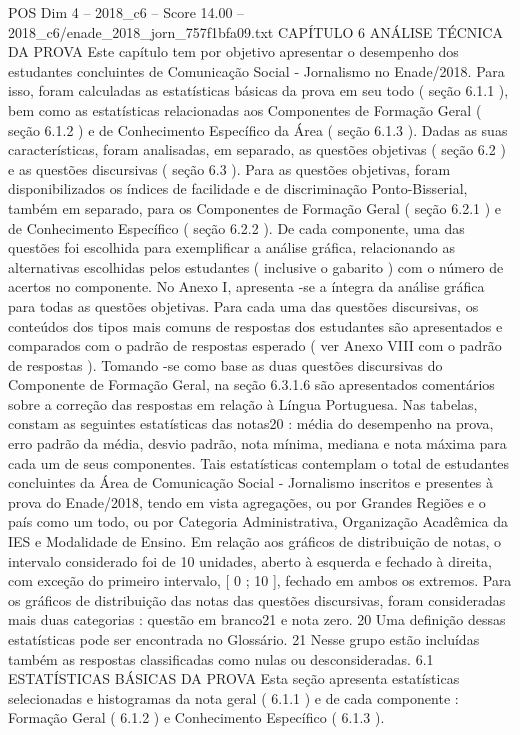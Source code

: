 \begin{textsample}{POS Dim 4 – 2018\_c6 – Score 14.00 – 2018\_c6/enade\_2018\_jorn\_757f1bfa09.txt}  \label{ex:f4_pos_005}
CAPÍTULO 6 ANÁLISE TÉCNICA DA PROVA Este capítulo tem por objetivo apresentar o desempenho dos estudantes concluintes de Comunicação Social - Jornalismo no Enade/2018.
Para isso, foram calculadas as estatísticas básicas da prova em seu todo ( seção 6.1.1 ), bem como as estatísticas relacionadas aos Componentes de Formação Geral ( seção 6.1.2 ) e de Conhecimento Específico da Área ( seção 6.1.3 ).
Dadas as suas características, foram analisadas, em separado, as questões objetivas ( seção 6.2 ) e as questões discursivas ( seção 6.3 ).
Para as questões objetivas, foram disponibilizados os índices de facilidade e de discriminação Ponto-Bisserial, também em separado, para os Componentes de Formação Geral ( seção 6.2.1 ) e de Conhecimento Específico ( seção 6.2.2 ).
De cada componente, uma das questões foi escolhida para exemplificar a análise gráfica, relacionando as alternativas escolhidas pelos estudantes ( inclusive o gabarito ) com o número de acertos no componente.
No Anexo I, apresenta -se a íntegra da análise gráfica para todas as questões objetivas.
Para cada uma das questões discursivas, os conteúdos dos tipos mais comuns de respostas dos estudantes são apresentados e comparados com o padrão de respostas esperado ( ver Anexo VIII com o padrão de respostas ).
Tomando -se como base as duas questões discursivas do Componente de Formação Geral, na seção 6.3.1.6 são apresentados comentários sobre a correção das respostas em relação à Língua Portuguesa.
Nas tabelas, constam as seguintes estatísticas das notas20 : média do desempenho na prova, erro padrão da média, desvio padrão, nota mínima, mediana e nota máxima para cada um de seus componentes.
Tais estatísticas contemplam o total de estudantes concluintes da Área de Comunicação Social - Jornalismo inscritos e presentes à prova do Enade/2018, tendo em vista agregações, ou por Grandes Regiões e o país como um todo, ou por Categoria Administrativa, Organização Acadêmica da IES e Modalidade de Ensino.
Em relação aos gráficos de distribuição de notas, o intervalo considerado foi de 10 unidades, aberto à esquerda e fechado à direita, com exceção do primeiro intervalo, [ 0 ; 10 ], fechado em ambos os extremos.
Para os gráficos de distribuição das notas das questões discursivas, foram consideradas mais duas categorias : questão em branco21 e nota zero. 20 Uma definição dessas estatísticas pode ser encontrada no Glossário. 21 Nesse grupo estão incluídas também as respostas classificadas como nulas ou desconsideradas. 6.1 ESTATÍSTICAS BÁSICAS DA PROVA Esta seção apresenta estatísticas selecionadas e histogramas da nota geral ( 6.1.1 ) e de cada componente : Formação Geral ( 6.1.2 ) e Conhecimento Específico ( 6.1.3 ).

\end{textsample}
